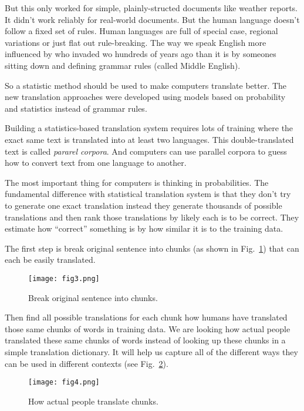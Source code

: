 \documentclass[10pt,twocolumn,letterpaper]{article}
\begin{document}
	\par
	But this only worked for simple, plainly-structed documents like weather reports. It didn't work reliably for real-world documents. But the human language doesn't follow a fixed set of rules. Human languages are full of special case, regional variations or just flat out rule-breaking. The way we speak English more influenced by who invaded wo hundreds of years ago than it is by someones sitting down and defining grammar rules (called Middle English).
	\par
	So a statistic method should be used to make computers translate better. The new translation approaches were developed using models based on probability and statistics instead of grammar rules. 
	\par
	Building a statistics-based translation system requires lots of training where the exact same text is translated into at least two languages. This double-translated text is called \emph{pararel corpora}. And computers can use parallel corpora to guess how to convert text from one language to another.
	\par
	The most important thing for computers is thinking in probabilities. The fundamental difference with statistical translation system is that they don't try to generate one exact translation instead they generate thousands of possible translations and then rank those translations by likely each is to be correct. They estimate how ``correct'' something is by how similar it is to the training data.
	\par
	The first step is break original sentence into chunks (as shown in Fig.~\ref{fig3}) that can each be easily translated.
	\begin{figure}[h]
		\centering
		\texttt{[image: fig3.png]}
		\caption{Break original sentence into chunks.} \label{fig3}
	\end{figure}
	\par
	Then find all possible translations for each chunk how humans have translated those same chunks of words in training data. We are looking how actual people translated these same chunks of words instead of looking up these chunks in a simple translation dictionary. It will help us capture all of the different ways they can be used in different contexts (see Fig.~\ref{fig4}).
	\begin{figure}[h]
		\centering
		\texttt{[image: fig4.png]}
		\caption{How actual people translate chunks.}\label{fig4}
	\end{figure}
\end{document}

